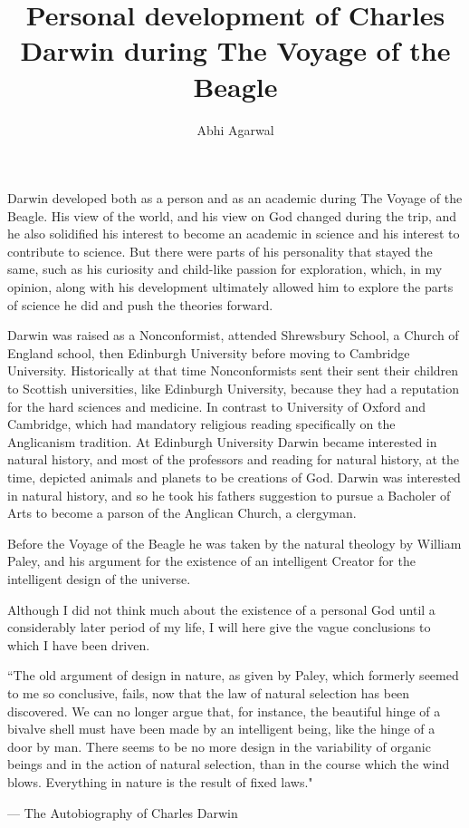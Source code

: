 \documentclass[11pt, oneside]{article}
\title{Personal development of Charles Darwin during The Voyage of the Beagle}
\author{Abhi Agarwal}
\date{}
\begin{document}
\maketitle


\par Darwin developed both as a person and as an academic during The Voyage of the Beagle. His view of the world, and his view on God changed during the trip, and he also solidified his interest to become an academic in science and his interest to contribute to science. But there were parts of his personality that stayed the same, such as his curiosity and child-like passion for exploration, which, in my opinion, along with his development ultimately allowed him to explore the parts of science he did and push the theories forward.


\par Darwin was raised as a Nonconformist, attended Shrewsbury School, a Church of England school, then Edinburgh University before moving to Cambridge University. Historically at that time Nonconformists sent their sent their children to Scottish universities, like Edinburgh University, because they had a reputation for the hard sciences and medicine. In contrast to University of Oxford and Cambridge, which had mandatory religious reading specifically on the Anglicanism tradition. At Edinburgh University Darwin became interested in natural history, and most of the professors and reading for natural history, at the time, depicted animals and planets to be creations of God. Darwin was interested in natural history, and so he took his fathers suggestion to pursue a Bacholer of Arts to become a parson of the Anglican Church, a clergyman.

Before the Voyage of the Beagle he was taken by the natural theology by William Paley, and his argument for the existence of an intelligent Creator for the intelligent design of the universe. 

\par Although I did not think much about the existence of a personal God until a considerably later period of my life, I will here give the vague conclusions to which I have been driven.

\epigraph{``The old argument of design in nature, as given by Paley, which formerly seemed to me so conclusive, fails, now that the law of natural selection has been discovered. We can no longer argue that, for instance, the beautiful hinge of a bivalve shell must have been made by an intelligent being, like the hinge of a door by man. There seems to be no more design in the variability of organic beings and in the action of natural selection, than in the course which the wind blows. Everything in nature is the result of fixed laws."}{--- \textup{The Autobiography of Charles Darwin}}
\end{document}
